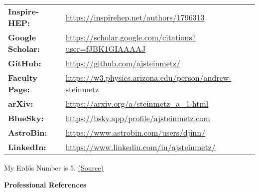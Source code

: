 \documentclass[11pt]{article}
\begin{document}
\begin{tabular}{@{}ll@{}}
    \textbf{Inspire-HEP:} & \href{https://inspirehep.net/authors/1796313}{https://inspirehep.net/authors/1796313} \\
    \textbf{Google Scholar:} & \href{https://scholar.google.com/citations?user=fJBK1GIAAAAJ}{https://scholar.google.com/citations?user=fJBK1GIAAAAJ} \\
    \textbf{GitHub:} & \href{https://github.com/ajsteinmetz/}{https://github.com/ajsteinmetz/} \\
    \textbf{Faculty Page:} & \href{https://w3.physics.arizona.edu/person/andrew-steinmetz}{https://w3.physics.arizona.edu/person/andrew-steinmetz} \\
    \textbf{arXiv:} & \href{https://arxiv.org/a/steinmetz\_a\_1.html}{https://arxiv.org/a/steinmetz\_a\_1.html} \\
    \textbf{BlueSky:} & \href{https://bsky.app/profile/ajsteinmetz.com}{https://bsky.app/profile/ajsteinmetz.com} \\
    \textbf{AstroBin:} & \href{https://www.astrobin.com/users/djinn/}{https://www.astrobin.com/users/djinn/} \\
    \textbf{LinkedIn:} & \href{https://www.linkedin.com/in/ajsteinmetz/}{https://www.linkedin.com/in/ajsteinmetz/} \\
\end{tabular}

My Erd\H{o}s Number is 5. \href{https://mathscinet.ams.org/mathscinet/freetools/collab-dist?source=1443426\&target=189017}{(Source)}

\medskip

{\Large\textbf{Professional References}}
\end{document}
